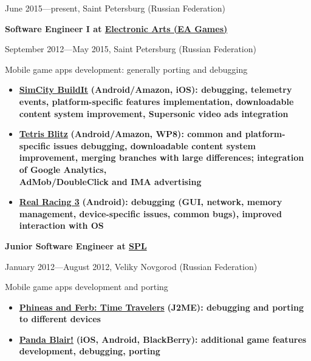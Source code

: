 {
\fontsize{9pt}{8pt}\selectfont
June 2015---present, Saint Petersburg (Russian Federation)
}
\vspace{0.5cm}

{
\fontsize{12pt}{12pt}\selectfont
\bfseries Software Engineer I at
\href{http://www.ea.com}{Electronic Arts (EA Games)}
\mdseries
}

{
\fontsize{9pt}{8pt}\selectfont
September 2012---May 2015, Saint Petersburg (Russian Federation)
}

\subitem Mobile game apps development: generally porting and debugging
\begin{itemize}[rightmargin=\dimexpr\linewidth-18cm-\leftmargin\relax]
\setlength{\itemindent}{20pt}
\item
    \href{http://www.ea.com/simcity-buildit}
        {\bfseries SimCity BuildIt\mdseries}
        \bfseries (Android/Amazon, iOS)\mdseries:
        debugging,
        telemetry events,
        platform-specific features implementation,
        downloadable content system improvement,
        Supersonic video ads integration
\item
    \href{http://www.tetrisblitz.com}
        {\bfseries Tetris Blitz\mdseries}
        \bfseries (Android/Amazon, WP8)\mdseries:
        common and platform-specific issues debugging,
        downloadable content system improvement,
        merging branches with large differences;
        integration of Google Analytics,\\
        AdMob/DoubleClick and IMA advertising
\item
    \href{http://www.ea.com/real-racing-3}
        {\bfseries Real Racing 3\mdseries}
        \bfseries (Android)\mdseries:
        debugging (GUI, network, memory management, device-specific issues, common bugs),
        improved interaction with OS
\end{itemize}

\vspace{0.5cm}

{
\fontsize{12pt}{12pt}\selectfont
\bfseries Junior Software Engineer at
\href{http://spl.co}{\bfseries SPL\mdseries}
\mdseries
}

{
\fontsize{9pt}{8pt}\selectfont
January 2012---August 2012, Veliky Novgorod (Russian Federation)
}

Mobile game apps development and porting

\begin{itemize}[rightmargin=\dimexpr\linewidth-18cm-\leftmargin\relax]
\setlength{\itemindent}{20pt}
\item
    \href{http://java.mob.org/game/phineas\_and\_ferb\_time\_travelers.html}
        {\bfseries Phineas and Ferb: Time Travelers\mdseries}
        \bfseries (J2ME)\mdseries:
        debugging and porting to different devices
\item
    \href{https://itunes.apple.com/us/app/panda-blair!/id500995558?mt=8}
        {\bfseries Panda Blair!\mdseries}
        \bfseries (iOS, Android, BlackBerry)\mdseries: additional game features development,
        debugging,
        porting
\end{itemize}

